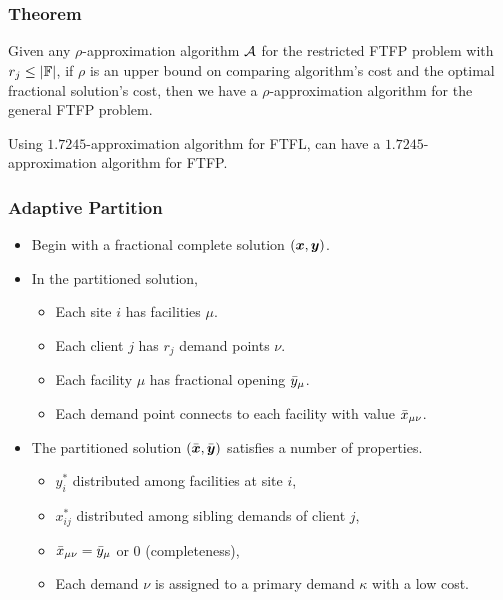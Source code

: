 \documentclass[handout, hyperref, xcolor=dvipsnames]{beamer}
\begin{document}
\begin{frame}
  \frametitle{Theorem}
  \begin{theorem}
    Given any $\rho$-approximation algorithm ${\cal A}$ for the
    restricted FTFP problem with $r_j \leq |\mathbb{F}|$, if $\rho$ is
    an upper bound on comparing algorithm's cost and the optimal
    fractional solution's cost, then we have a $\rho$-approximation
    algorithm for the general FTFP problem.
  \end{theorem}

  \begin{corollary}
    Using $1.7245$-approximation algorithm for FTFL, can have a
    $1.7245$-approximation algorithm for FTFP.
  \end{corollary}
\end{frame}

\begin{frame}
  \frametitle{Adaptive Partition}
  \begin{itemize}
  \item Begin with a fractional complete solution $(\boldsymbol{x},\boldsymbol{y})$.
  \item In the partitioned solution,
    \begin{itemize}
    \item Each site $i$ has facilities $\mu$.
    \item Each client $j$ has $r_j$ demand points $\nu$.
    \item Each facility $\mu$ has fractional opening ${\bar y}_{\mu}$.
    \item Each demand point connects to each facility with value
      ${\bar x}_{\mu\nu}$.
    \end{itemize}
    \item The partitioned solution $(\bar{\boldsymbol{x}},\bar{\boldsymbol{y}})$ satisfies a
      number of properties.
      \begin{itemize}
      \item $y_i^\ast$ distributed among facilities at site $i$,
      \item $x_{ij}^\ast$ distributed among sibling demands of client
        $j$,
      \item ${\bar x}_{\mu\nu} = {\bar y}_{\mu}$ or $0$ (completeness),
      \item Each demand $\nu$ is assigned to a primary demand $\kappa$
        with a low cost.
      \end{itemize}
  \end{itemize}
\end{frame}
\end{document}
